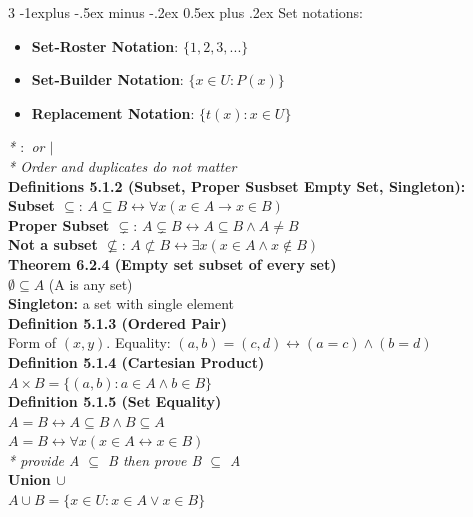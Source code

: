 \documentclass[10pt,landscape]{article}
\makeatletter
\renewcommand{\subsection}{\@startsection{subsection}{2}{0mm}%
    {-1explus -.5ex minus -.2ex}%
    {0.5ex plus .2ex}%
    {\normalfont\normalsize\bfseries}}
\makeatother
\begin{document}
\begin{multicols}{3}
    \subsection{Set notations:}
    \begin{itemize}
        \item \textbf{Set-Roster Notation}: $\{ 1, 2, 3, ...\}$
        \item \textbf{Set-Builder Notation}: $\{ x \in U : P(x) \}$
        \item \textbf{Replacement Notation}: $\{ t(x) : x \in U \}$
    \end{itemize}
    \textit{* $:$ or $|$} \\
    \textit{* Order and duplicates do not matter} \\
    \textbf{Definitions 5.1.2 (Subset, Proper Susbset Empty Set, Singleton):} \\
    \textbf{Subset $\subseteq$}: $A \subseteq B \leftrightarrow \forall x (x \in A \rightarrow x \in B)$ \\
    \textbf{Proper Subset $\subsetneq $}: $A \subsetneq B \leftrightarrow A \subseteq B \land A \neq B$ \\
    \textbf{Not a subset $ \not\subseteq$}: $A \not\subset B \leftrightarrow \exists x (x \in A \land x \not\in B)$ \\
    \textbf{Theorem 6.2.4 (Empty set subset of every set)} \\
    $\emptyset \subseteq A$ (A is any set) \\
    \textbf{Singleton:} a set with single element \\
    \textbf{Definition 5.1.3 (Ordered Pair)} \\
    Form of $(x, y)$. Equality: $(a, b) = (c, d) \leftrightarrow (a = c) \land (b = d)$ \\
    \textbf{Definition 5.1.4 (Cartesian Product)} \\
    $A \times B = \{(a, b) : a \in A \land b \in B\}$ \\
    \textbf{Definition 5.1.5 (Set Equality)} \\
    $A = B \leftrightarrow A \subseteq B \land B \subseteq A$ \\
    $A = B \leftrightarrow \forall x (x \in A \leftrightarrow x \in B)$ \\
    \textit{* provide A $\subseteq$ B then prove B $\subseteq$ A} \\
    \textbf{Union $\cup$} \\
    $A \cup B = \{ x \in U : x \in A \lor x \in B \}$ \\

\end{multicols}
\end{document}
